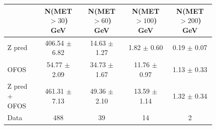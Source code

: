 \begin{figure}[hbtp]
  \begin{center}

	\medskip 

    \begin{tabular}{lcccc}
\hline
                        &   N(MET $>30$)  GeV    &   N(MET $>60$)  GeV    &   N(MET $>100$) GeV    &   N(MET $>200$) GeV \\
\hline
        Z pred  &  406.54  $\pm$  6.82  &   14.63  $\pm$  1.27  &    1.82  $\pm$  0.60  &    0.19  $\pm$  0.07 \\
          OFOS  &   54.77  $\pm$  2.09  &   34.73  $\pm$  1.67  &   11.76  $\pm$  0.97  &    1.13  $\pm$  0.33 \\
\hline
 Z pred + OFOS  &  461.31  $\pm$  7.13  &   49.36  $\pm$  2.10  &   13.59  $\pm$  1.14  &    1.32  $\pm$  0.34 \\
\hline
          Data  &                  488  &                   39  &                   14  &                    2 \\


\hline
    \end{tabular}

    \caption{  }
    \label{fig:pfmet_eemm}
  \end{center}
\end{figure}

